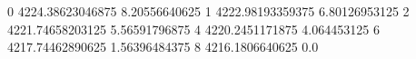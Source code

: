 0 4224.38623046875 8.20556640625
1 4222.98193359375 6.80126953125
2 4221.74658203125 5.56591796875
4 4220.2451171875 4.064453125
6 4217.74462890625 1.56396484375
8 4216.1806640625 0.0
